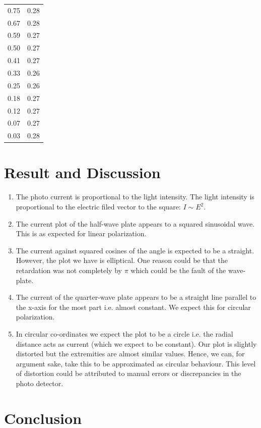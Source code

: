 \documentclass{article}
\begin{document}
\begin{table}[!htb]
\begin{minipage}{.5\linewidth}
\begin{tabular}{@{}cc@{}}
0.75 & 0.28 \\
0.67 & 0.28 \\
0.59 & 0.27 \\
0.50 & 0.27 \\
0.41 & 0.27 \\
0.33 & 0.26 \\
0.25 & 0.26 \\
0.18 & 0.27 \\
0.12 & 0.27 \\
0.07 & 0.27 \\
0.03 & 0.28 \\ \bottomrule
\end{tabular}
    \end{minipage} 
\end{table}




\section{Result and Discussion}

\begin{enumerate}
    \item The photo current is proportional to the light intensity.  The light intensity is proportional to the electric filed vector to the square: $I \sim E^2$.
    \item The current plot of the half-wave plate appears to a squared sinusoidal wave. This is as expected for linear polarization.
    \item The current against squared cosines of the angle is expected to be a straight. However, the plot we have is elliptical. One reason could be that the retardation was not completely by $\pi$ which could be the fault of the wave-plate. 
    \item The current of the quarter-wave plate appears to be a straight line parallel to the x-axis for the most part i.e. almost constant. We expect this for circular polarization.
    \item In circular co-ordinates we expect the plot to be a circle i.e. the radial distance acts as current (which we expect to be constant). Our plot is slightly distorted but the extremities are almost similar values. Hence, we can, for argument sake, take this to be approximated as circular behaviour. This level of distortion could be attributed to manual errors or discrepancies in the photo detector.
\end{enumerate}

\section{Conclusion}
\end{document}
